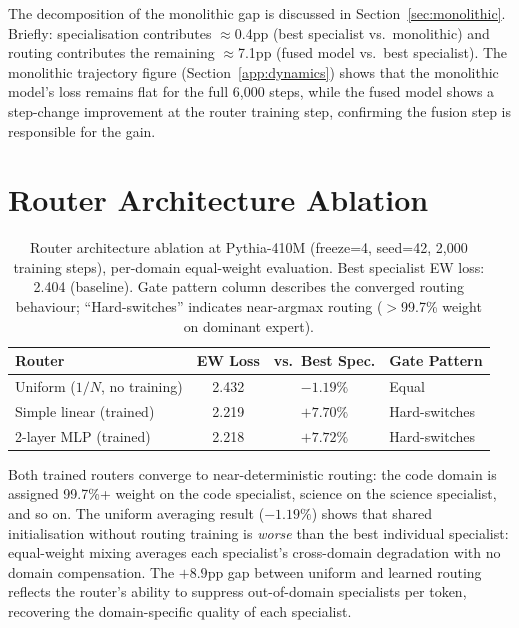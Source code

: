 \documentclass{article}
\begin{document}
The decomposition of the monolithic gap is discussed in Section~\ref{sec:monolithic}. Briefly: specialisation contributes $\approx$0.4pp (best specialist vs.\ monolithic) and routing contributes the remaining $\approx$7.1pp (fused model vs.\ best specialist). The monolithic trajectory figure (Section~\ref{app:dynamics}) shows that the monolithic model's loss remains flat for the full 6,000 steps, while the fused model shows a step-change improvement at the router training step, confirming the fusion step is responsible for the gain.

\section{Router Architecture Ablation}
\label{app:router}

\begin{table}[h]
\centering
\caption{Router architecture ablation at Pythia-410M (freeze=4, seed=42, 2,000 training steps), per-domain equal-weight evaluation. Best specialist EW loss: 2.404 (baseline). Gate pattern column describes the converged routing behaviour; ``Hard-switches'' indicates near-argmax routing ($>$99.7\% weight on dominant expert).}
\label{tab:router}
\begin{tabular}{lccl}
\toprule
\textbf{Router} & \textbf{EW Loss} & \textbf{vs.\ Best Spec.} & \textbf{Gate Pattern} \\
\midrule
Uniform ($1/N$, no training)  & 2.432 & $-1.19\%$  & Equal \\
Simple linear (trained)       & 2.219 & $+7.70\%$  & Hard-switches \\
2-layer MLP (trained)         & 2.218 & $+7.72\%$  & Hard-switches \\
\bottomrule
\end{tabular}
\end{table}

Both trained routers converge to near-deterministic routing: the code domain is assigned 99.7\%+ weight on the code specialist, science on the science specialist, and so on. The uniform averaging result ($-1.19\%$) shows that shared initialisation without routing training is \emph{worse} than the best individual specialist: equal-weight mixing averages each specialist's cross-domain degradation with no domain compensation. The $+8.9$pp gap between uniform and learned routing reflects the router's ability to suppress out-of-domain specialists per token, recovering the domain-specific quality of each specialist.
\end{document}

